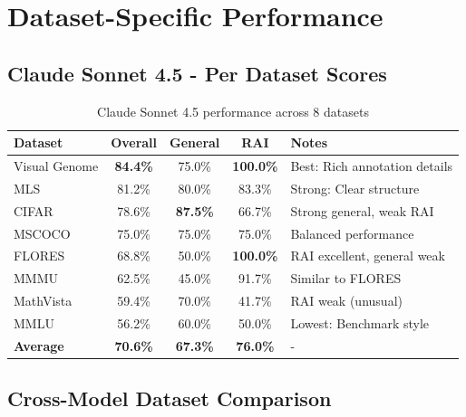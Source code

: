 \documentclass[11pt,a4paper]{article}
\begin{document}
\section{Dataset-Specific Performance}

\subsection{Claude Sonnet 4.5 - Per Dataset Scores}

\begin{table}[h]
\centering
\begin{tabular}{lcccp{4cm}}
\toprule
\textbf{Dataset} & \textbf{Overall} & \textbf{General} & \textbf{RAI} & \textbf{Notes} \\
\midrule
Visual Genome & \textbf{84.4\%} & 75.0\% & \textbf{100.0\%} & Best: Rich annotation details \\
MLS & 81.2\% & 80.0\% & 83.3\% & Strong: Clear structure \\
CIFAR & 78.6\% & \textbf{87.5\%} & 66.7\% & Strong general, weak RAI \\
MSCOCO & 75.0\% & 75.0\% & 75.0\% & Balanced performance \\
FLORES & 68.8\% & 50.0\% & \textbf{100.0\%} & RAI excellent, general weak \\
MMMU & 62.5\% & 45.0\% & 91.7\% & Similar to FLORES \\
MathVista & 59.4\% & 70.0\% & 41.7\% & RAI weak (unusual) \\
MMLU & 56.2\% & 60.0\% & 50.0\% & Lowest: Benchmark style \\
\midrule
\textbf{Average} & \textbf{70.6\%} & \textbf{67.3\%} & \textbf{76.0\%} & - \\
\bottomrule
\end{tabular}
\caption{Claude Sonnet 4.5 performance across 8 datasets}
\end{table}

\subsection{Cross-Model Dataset Comparison}
\end{document}
